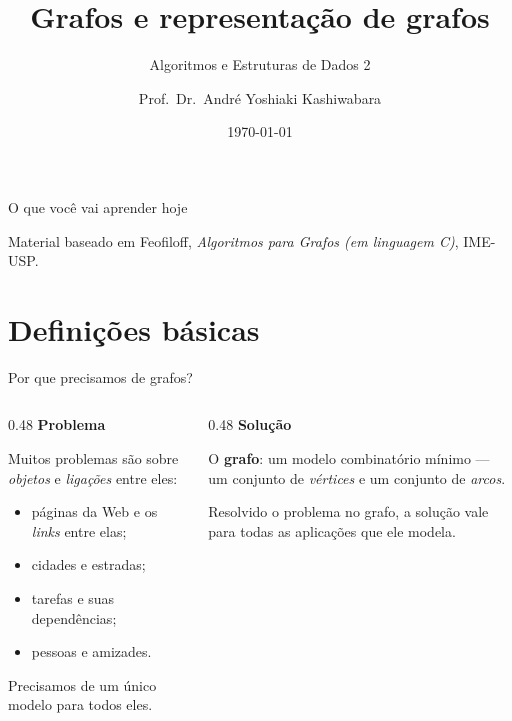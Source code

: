 \documentclass[aspectratio=169]{beamer}
\title{Grafos e representação de grafos}
\subtitle{Algoritmos e Estruturas de Dados 2}
\author[André Y. Kashiwabara <andreyoshiaki@dcomp.ufs.br>]{Prof.\ Dr.\ André Yoshiaki Kashiwabara}
\institute{Departamento de Computação --- Universidade Federal de Sergipe}
\date{\today}
\begin{document}
\begin{frame}
  \titlepage
\end{frame}

\begin{frame}{O que você vai aprender hoje}
  \begin{center}
  \end{center}
  \vfill
  {\scriptsize Material baseado em Feofiloff, \emph{Algoritmos para Grafos (em linguagem C)}, IME-USP.}
\end{frame}

\section{Definições básicas}

\begin{frame}{Por que precisamos de grafos?}
  \begin{columns}[T]
    \begin{column}{0.48\textwidth}
      \textbf{Problema}

      \medskip
      {\small
      Muitos problemas são sobre \emph{objetos} e \emph{ligações} entre eles:
      \begin{itemize}\scriptsize
        \item páginas da Web e os \emph{links} entre elas;
        \item cidades e estradas;
        \item tarefas e suas dependências;
        \item pessoas e amizades.
      \end{itemize}
      Precisamos de um único modelo para todos eles.}
    \end{column}
    \begin{column}{0.48\textwidth}
      \textbf{Solução}

      \medskip
      {\small
      O \textbf{grafo}: um modelo combinatório mínimo --- um conjunto de
      \emph{vértices} e um conjunto de \emph{arcos}.

      \medskip
      Resolvido o problema no grafo, a solução vale para todas as aplicações
      que ele modela.}
    \end{column}
  \end{columns}
\end{frame}
\end{document}
